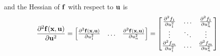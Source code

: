 and the Hessian of $\mathbf{f}$ with respect to $\mathbf{u}$ is
\begin{equation*}
  \frac{\partial^2 \mathbf{f}(\mathbf{x}, \mathbf{u})}{\partial \mathbf{u}^2} =
  \begin{bmatrix}
    \frac{\partial^2 \mathbf{f}(\mathbf{x}, \mathbf{u})}{\partial u_1^2} & \hdots &
      \frac{\partial^2 \mathbf{f}(\mathbf{x}, \mathbf{u})}{\partial u_n^2}
  \end{bmatrix} =
  \begin{bmatrix}
    \frac{\partial^2 f_1}{\partial u_1^2} & \hdots &
      \frac{\partial^2 f_1}{\partial u_n^2} \\
    \vdots & \ddots & \vdots \\
    \frac{\partial^2 f_m}{\partial u_1^2} & \hdots &
      \frac{\partial^2 f_m}{\partial u_n^2}
  \end{bmatrix}
\end{equation*}

